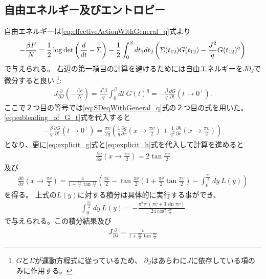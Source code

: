 \subsection{自由エネルギー及びエントロピー}
自由エネルギーは\eqref{eq:effectiveActionWithGeneral_q}式より
\begin{align}
	-\frac{\beta F}{N} = \frac{1}{2}\log\det\left(\frac{d}{dt} - \Sigma\right)
		- \frac{1}{2}\int_0^{\beta} dt_1 dt_2
		\left(\Sigma(t_{12})G(t_{12}) - \frac{J^2}{q} G(t_{12})^q \right)
\end{align}
で与えられる。
右辺の第一項目の計算を避けるためには自由エネルギーを$J\partial_J$で微分すると良い
\footnote{$G$と$\Sigma$が運動方程式に従っているため、
$\partial_J$はあらわに$J$に依存している項のみに作用する。}:
\begin{align}
	J\frac{\partial}{\partial J}\left(-\frac{\beta F}{N}\right)
	= \frac{J^2 \beta}{q}\int_0^{\beta} dt\ G(t)^q
	= -\frac{\beta}{q}\frac{\partial G}{\partial t}(t \to 0^+).
	\label{eq:differentiated_free_energy}
\end{align}
ここで２つ目の等号では\eqref{eq:SDeqWithGeneral_q}式の２つ目の式を用いた。
\eqref{eq:subleading_of_G_t}式を代入すると
\begin{align}
	-\frac{\beta}{q}\frac{\partial G}{\partial t}(t \to 0^+)
	= \frac{\pi v}{2q}\left(
		\frac{1}{q}\frac{\partial g}{\partial x}\left(x \to \frac{\pi v}{2}\right)
		+ \frac{1}{q^2}\frac{\partial h}{\partial x}\left(x \to \frac{\pi v}{2}\right)
	\right)
\end{align}
となり、更に\eqref{eq:explicit_g}式と\eqref{eq:explicit_h}式を代入して計算を進めると
\begin{align}
	\frac{\partial g}{\partial x}\left(x \to \frac{\pi v}{2}\right)
	= 2 \tan \frac{\pi v}{2}
\end{align}
及び
\begin{align}
	\frac{\partial h}{\partial x}\left(x \to \frac{\pi v}{2}\right)
	= \frac{4}{1 + \frac{\pi v}{2}\tan \frac{\pi v}{2}}\left(
		\frac{\pi v}{2}
		- \tan \frac{\pi v}{2}\left(1 + \frac{\pi v}{2}\tan \frac{\pi v}{2}\right)
		- \int_0^{\frac{\pi v}{2}} dy\ L(y)
	\right)
\end{align}
を得る。
上式の$L(y)$に対する積分は具体的に実行する事ができ、
\begin{align}
	\int_0^{\frac{\pi v}{2}} dy\ L(y)
		= -\frac{\pi^2 v^2(\pi v + 3\sin \pi v)}{24 \cos^2 \frac{\pi v}{2}}
\end{align}
で与えられる\cite{tarnopolsky}。この積分結果及び
\begin{align}
	J\frac{\partial}{\partial J} = \frac{v}{1 + \frac{\pi v}{2}\tan \frac{\pi v}{2}}
\end{align}
